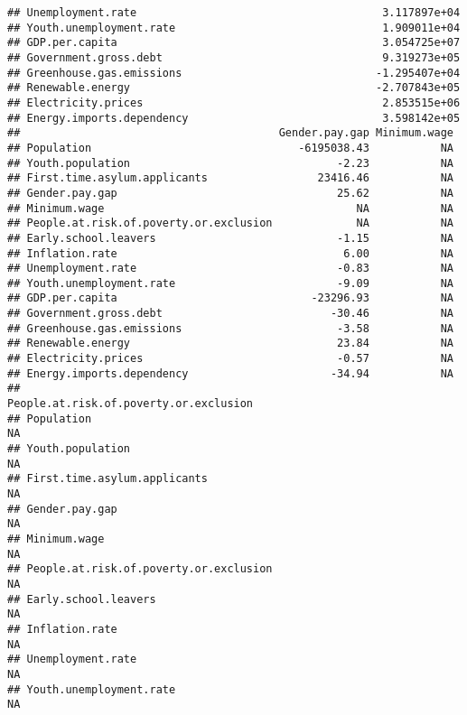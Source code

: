 \documentclass[
]{article}
\begin{document}
\begin{verbatim}
## Unemployment.rate                                      3.117897e+04
## Youth.unemployment.rate                                1.909011e+04
## GDP.per.capita                                         3.054725e+07
## Government.gross.debt                                  9.319273e+05
## Greenhouse.gas.emissions                              -1.295407e+04
## Renewable.energy                                      -2.707843e+05
## Electricity.prices                                     2.853515e+06
## Energy.imports.dependency                              3.598142e+05
##                                        Gender.pay.gap Minimum.wage
## Population                                -6195038.43           NA
## Youth.population                                -2.23           NA
## First.time.asylum.applicants                 23416.46           NA
## Gender.pay.gap                                  25.62           NA
## Minimum.wage                                       NA           NA
## People.at.risk.of.poverty.or.exclusion             NA           NA
## Early.school.leavers                            -1.15           NA
## Inflation.rate                                   6.00           NA
## Unemployment.rate                               -0.83           NA
## Youth.unemployment.rate                         -9.09           NA
## GDP.per.capita                              -23296.93           NA
## Government.gross.debt                          -30.46           NA
## Greenhouse.gas.emissions                        -3.58           NA
## Renewable.energy                                23.84           NA
## Electricity.prices                              -0.57           NA
## Energy.imports.dependency                      -34.94           NA
##                                        People.at.risk.of.poverty.or.exclusion
## Population                                                                 NA
## Youth.population                                                           NA
## First.time.asylum.applicants                                               NA
## Gender.pay.gap                                                             NA
## Minimum.wage                                                               NA
## People.at.risk.of.poverty.or.exclusion                                     NA
## Early.school.leavers                                                       NA
## Inflation.rate                                                             NA
## Unemployment.rate                                                          NA
## Youth.unemployment.rate                                                    NA

\end{verbatim}
\end{document}

